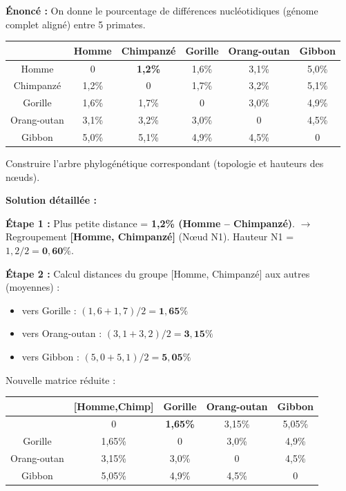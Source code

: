 \documentclass[11pt]{article}
\begin{document}
\begin{exoresolu}
\textbf{Énoncé :} On donne le pourcentage de différences nucléotidiques (génome complet aligné) entre 5 primates.
\begin{center}
\begin{tabular}{|c|ccccc|}\hline
 & Homme & Chimpanzé & Gorille & Orang-outan & Gibbon \\ \hline
Homme & 0 & \textbf{1,2\%} & 1,6\% & 3,1\% & 5,0\% \\
Chimpanzé & 1,2\% & 0 & 1,7\% & 3,2\% & 5,1\% \\
Gorille & 1,6\% & 1,7\% & 0 & 3,0\% & 4,9\% \\
Orang-outan & 3,1\% & 3,2\% & 3,0\% & 0 & 4,5\% \\
Gibbon & 5,0\% & 5,1\% & 4,9\% & 4,5\% & 0 \\ \hline
\end{tabular}
\end{center}
Construire l'arbre phylogénétique correspondant (topologie et hauteurs des nœuds).

\tcblower
\textbf{Solution détaillée :}

\textbf{Étape 1 :} Plus petite distance = \textbf{1,2\% (Homme -- Chimpanzé)}. 
$\rightarrow$ Regroupement \textbf{[Homme, Chimpanzé]} (Nœud N1). Hauteur N1 = $1,2 / 2 = \mathbf{0,60\%}$.

\textbf{Étape 2 :} Calcul distances du groupe [Homme, Chimpanzé] aux autres (moyennes) :
\begin{itemize}
    \item vers Gorille : $(1,6 + 1,7) / 2 = \mathbf{1,65\%}$
    \item vers Orang-outan : $(3,1 + 3,2) / 2 = \mathbf{3,15\%}$
    \item vers Gibbon : $(5,0 + 5,1) / 2 = \mathbf{5,05\%}$
\end{itemize}
Nouvelle matrice réduite :
\begin{center}
\begin{tabular}{|c|cccc|}\hline
 & [Homme,Chimp] & Gorille & Orang-outan & Gibbon \\ \hline
[Homme,Chimp] & 0 & \textbf{1,65\%} & 3,15\% & 5,05\% \\
Gorille & 1,65\% & 0 & 3,0\% & 4,9\% \\
Orang-outan & 3,15\% & 3,0\% & 0 & 4,5\% \\
Gibbon & 5,05\% & 4,9\% & 4,5\% & 0 \\ \hline
\end{tabular}
\end{center}


\end{exoresolu}
\end{document}
